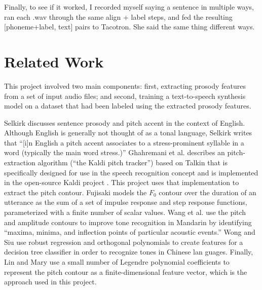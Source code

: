 \documentclass{article}
\begin{document}
Finally, to see if it worked, I recorded myself saying a sentence in multiple ways, ran each .wav through the same align + label steps, and fed the resulting [phoneme+label, text] pairs to Tacotron. She said the same thing different ways.

\section{Related Work}
\label{sec:sota}

This project involved two main components: first, extracting prosody features from a set of input audio files; and second, training a text-to-speech synthesis model on a dataset that had been labeled using the extracted prosody features.

Selkirk \cite{selkirk1995sentence} discusses sentence prosody and pitch accent in the context of English. Although English is generally not thought of as a tonal language, Selkirk writes that ``[i]n English a pitch accent associates to a stress-prominent syllable in a word (typically the main word stress.)''
Ghahremani et al. \cite{ghahremani2014pitch} describes an pitch-extraction algorithm (``the Kaldi pitch tracker'') based on Talkin \cite{talkin1995robust} that is specifically designed for use in the speech recognition concept and is implemented in the open-source Kaldi project \cite{Povey_ASRU2011}. This project uses that implementation to extract the pitch contour.
Fujisaki \cite{fujisaki2004information} models the $F_0$ contour over the duration of an utterance as the sum of a set of impulse response and step response functions, parameterized with a finite number of scalar values.
Wang et al. \cite{wang2008mandarin} use the pitch and amplitude contours to improve tone recognition in Mandarin by identifying ``maxima, minima, and inflection points of particular acoustic events.''
Wong and Siu \cite{pui2004decision} use robust regression and orthogonal polynomials to create features for a decision tree classifier in order to recognize tones in Chinese lan guages. Finally, Lin \cite{lin2005language} and Mary \cite{mary2011extraction} use a small number of Legendre polynomial coefficients to represent the pitch contour as a finite-dimensional feature vector, which is the approach used in this project.
\end{document}
